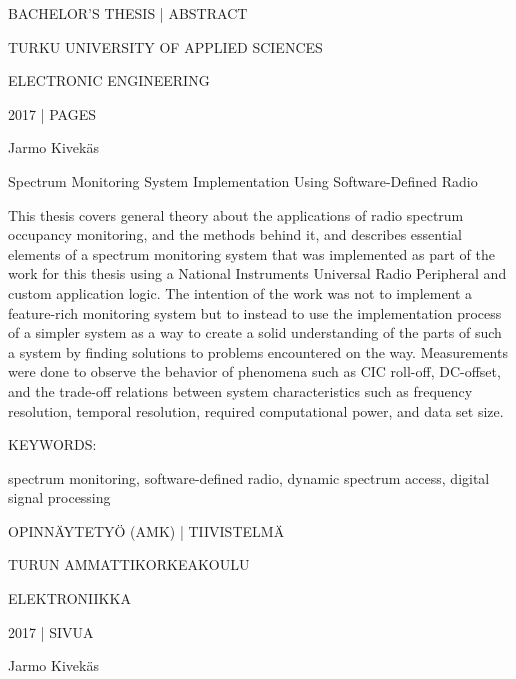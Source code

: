 BACHELOR'S THESIS | ABSTRACT

TURKU UNIVERSITY OF APPLIED SCIENCES

ELECTRONIC ENGINEERING

2017 | \pageref{LastPage} PAGES


\vspace{10mm}
{\Large Jarmo Kivekäs \par}

\vspace{10mm}
{\huge Spectrum Monitoring System Implementation Using Software-Defined Radio \par}

\vspace{10mm}



This thesis covers general theory about the applications of radio spectrum occupancy
monitoring, and the methods behind it, and describes essential elements of a
spectrum monitoring system that was implemented as part of the work for this
thesis using a National Instruments Universal Radio Peripheral and custom
application logic. The intention of the work was not to implement a feature-rich
monitoring system but to instead to use the implementation process of a simpler
system as a way to create a solid understanding of the parts of such
a system by finding solutions to problems encountered on the way.
Measurements were done to observe the behavior of phenomena such as CIC roll-off,
DC-offset, and the trade-off relations between system characteristics such as
frequency resolution, temporal resolution, required computational power,
and data set size.



\vspace{30mm}

KEYWORDS:

spectrum monitoring, software-defined radio, dynamic spectrum access, digital signal processing



\clearpage


OPINNÄYTETYÖ (AMK) | TIIVISTELMÄ

TURUN AMMATTIKORKEAKOULU

ELEKTRONIIKKA

2017 | \pageref{LastPage} SIVUA


\vspace{10mm}
{\Large Jarmo Kivekäs \par}

